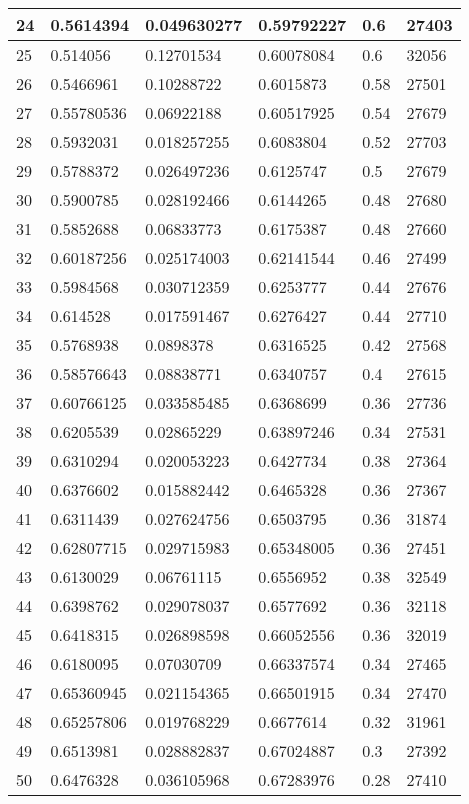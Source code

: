 \begin{longtable}{|l|l|l|l|l|l|}
24 & 0.5614394 & 0.049630277 & 0.59792227 & 0.6 & 27403 \\ \hline 
25 & 0.514056 & 0.12701534 & 0.60078084 & 0.6 & 32056 \\ \hline 
26 & 0.5466961 & 0.10288722 & 0.6015873 & 0.58 & 27501 \\ \hline 
27 & 0.55780536 & 0.06922188 & 0.60517925 & 0.54 & 27679 \\ \hline 
28 & 0.5932031 & 0.018257255 & 0.6083804 & 0.52 & 27703 \\ \hline 
29 & 0.5788372 & 0.026497236 & 0.6125747 & 0.5 & 27679 \\ \hline 
30 & 0.5900785 & 0.028192466 & 0.6144265 & 0.48 & 27680 \\ \hline 
31 & 0.5852688 & 0.06833773 & 0.6175387 & 0.48 & 27660 \\ \hline 
32 & 0.60187256 & 0.025174003 & 0.62141544 & 0.46 & 27499 \\ \hline 
33 & 0.5984568 & 0.030712359 & 0.6253777 & 0.44 & 27676 \\ \hline 
34 & 0.614528 & 0.017591467 & 0.6276427 & 0.44 & 27710 \\ \hline 
35 & 0.5768938 & 0.0898378 & 0.6316525 & 0.42 & 27568 \\ \hline 
36 & 0.58576643 & 0.08838771 & 0.6340757 & 0.4 & 27615 \\ \hline 
37 & 0.60766125 & 0.033585485 & 0.6368699 & 0.36 & 27736 \\ \hline 
38 & 0.6205539 & 0.02865229 & 0.63897246 & 0.34 & 27531 \\ \hline 
39 & 0.6310294 & 0.020053223 & 0.6427734 & 0.38 & 27364 \\ \hline 
40 & 0.6376602 & 0.015882442 & 0.6465328 & 0.36 & 27367 \\ \hline 
41 & 0.6311439 & 0.027624756 & 0.6503795 & 0.36 & 31874 \\ \hline 
42 & 0.62807715 & 0.029715983 & 0.65348005 & 0.36 & 27451 \\ \hline 
43 & 0.6130029 & 0.06761115 & 0.6556952 & 0.38 & 32549 \\ \hline 
44 & 0.6398762 & 0.029078037 & 0.6577692 & 0.36 & 32118 \\ \hline 
45 & 0.6418315 & 0.026898598 & 0.66052556 & 0.36 & 32019 \\ \hline 
46 & 0.6180095 & 0.07030709 & 0.66337574 & 0.34 & 27465 \\ \hline 
47 & 0.65360945 & 0.021154365 & 0.66501915 & 0.34 & 27470 \\ \hline 
48 & 0.65257806 & 0.019768229 & 0.6677614 & 0.32 & 31961 \\ \hline 
49 & 0.6513981 & 0.028882837 & 0.67024887 & 0.3 & 27392 \\ \hline 
50 & 0.6476328 & 0.036105968 & 0.67283976 & 0.28 & 27410 \\ \hline 
\end{longtable}